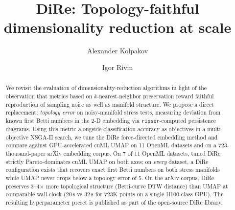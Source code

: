\documentclass[9pt,twocolumn,twoside]{pnas-new}
\begin{document}
\title{DiRe: Topology-faithful dimensionality reduction at scale}

\author[a]{Alexander Kolpakov}
\author[b,1]{Igor Rivin}






\begin{abstract}
We revisit the evaluation of dimensionality-reduction algorithms in light of
the observation that metrics based on $k$-nearest-neighbor preservation reward
faithful reproduction of sampling noise as well as manifold structure. We
propose a direct replacement: \emph{topology error} on noisy-manifold stress
tests, measuring deviation from known first Betti numbers in the 2-D embedding
via \texttt{ripser}-computed persistence diagrams. Using this metric alongside
classification accuracy as objectives in a multi-objective NSGA-II search, we
tune the DiRe force-directed embedding method and compare against
GPU-accelerated cuML UMAP on 11 OpenML datasets and on a
723-thousand-paper arXiv embedding corpus. On 7 of 11 OpenML datasets, tuned
DiRe strictly Pareto-dominates cuML UMAP on both axes; on \emph{every}
dataset, a DiRe configuration exists that recovers exact first Betti numbers
on both stress manifolds while UMAP never drops below a topology error of 5.
On the arXiv corpus, DiRe preserves 3--4$\times$ more topological structure
(Betti-curve DTW distance) than UMAP at comparable wall-clock (20\,s vs 32\,s
for 723K points on a single H100-class GPU). The resulting hyperparameter
preset is published as part of the open-source DiRe library.
\end{abstract}
\end{document}
